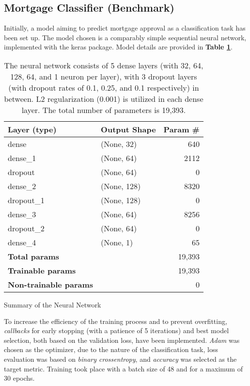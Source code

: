 
\subsection{Mortgage Classifier (Benchmark)}\label{subsec:Model_Training_and_Prediction}

Initially, a model aiming to predict mortgage approval as a classification task has been set up. The model chosen is a comparably simple sequential neural network, implemented with the keras package. Model details are provided in \textbf{Table \ref{tab:CH03_Model_Details}}.

\begin{table}[h]
    \centering
    \begin{tabularx}{\textwidth}{lXr}
    \hline
    \textbf{Layer (type)} & \textbf{Output Shape} & \textbf{Param \#} \\
    \hline
    dense & (None, 32) & 640 \\
    dense\_1 & (None, 64) & 2112 \\
    dropout & (None, 64) & 0 \\
    dense\_2 & (None, 128) & 8320 \\
    dropout\_1 & (None, 128) & 0 \\
    dense\_3 & (None, 64) & 8256 \\
    dropout\_2 & (None, 64) & 0 \\
    dense\_4 & (None, 1) & 65 \\
    \hline
    \textbf{Total params} & & 19,393 \\
    \textbf{Trainable params} & & 19,393 \\
    \textbf{Non-trainable params} & & 0 \\
    \hline
    \end{tabularx}
    \caption{Summary of the Neural Network}
    \caption*{The neural network consists of 5 dense layers (with 32, 64, 128, 64, and 1 neuron per layer), with 3 dropout layers (with dropout rates of 0.1, 0.25, and 0.1 respectively) in between. L2 regularization (0.001) is utilized in each dense layer. The total number of parameters is 19,393.}
    \label{tab:CH03_Model_Details}
\end{table}

To increase the efficiency of the training process and to prevent overfitting, \textit{callbacks} for early stopping (with a patience of 5 iterations) and best model selection, both based on the validation loss, have been implemented. 
\textit{Adam} was chosen as the optimizer, due to the nature of the classification task, loss evaluation was based on \textit{binary crossentropy}, and \textit{accuracy} was selected as the target metric. Training took place with a batch size of 48 and for a maximum of 30 epochs. 

